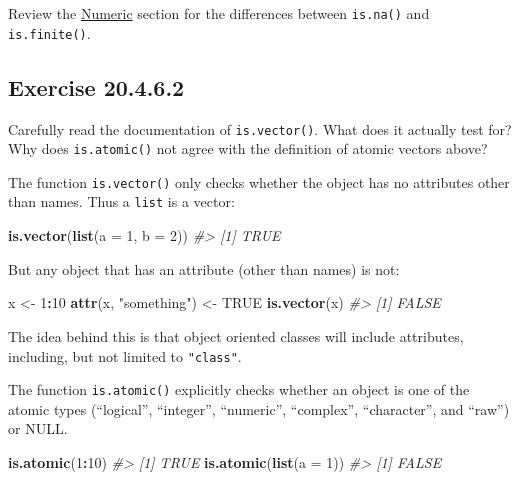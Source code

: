 \documentclass[]{book}
\newenvironment{Shaded}{\begin{snugshade}}{\end{snugshade}}
\newcommand{\CommentTok}[1]{\textcolor[rgb]{0.56,0.35,0.01}{\textit{#1}}}
\newcommand{\DataTypeTok}[1]{\textcolor[rgb]{0.13,0.29,0.53}{#1}}
\newcommand{\DecValTok}[1]{\textcolor[rgb]{0.00,0.00,0.81}{#1}}
\newcommand{\KeywordTok}[1]{\textcolor[rgb]{0.13,0.29,0.53}{\textbf{#1}}}
\newcommand{\NormalTok}[1]{#1}
\newcommand{\OperatorTok}[1]{\textcolor[rgb]{0.81,0.36,0.00}{\textbf{#1}}}
\newcommand{\OtherTok}[1]{\textcolor[rgb]{0.56,0.35,0.01}{#1}}
\newcommand{\StringTok}[1]{\textcolor[rgb]{0.31,0.60,0.02}{#1}}
\theoremstyle{plain}
\theoremstyle{remark}
\begin{document}
Review the \href{http://r4ds.had.co.nz/vectors.html\#numeric}{Numeric} section for the differences between \texttt{is.na()} and \texttt{is.finite()}.

\hypertarget{exercise-20.4.6.2}{%
\subsection*{\texorpdfstring{Exercise {20.4.6.2}}{Exercise 20.4.6.2}}\label{exercise-20.4.6.2}}

Carefully read the documentation of \texttt{is.vector()}. What does it actually test for? Why does \texttt{is.atomic()} not agree with the definition of atomic vectors above?

The function \texttt{is.vector()} only checks whether the object has no attributes other than names. Thus a \texttt{list} is a vector:

\begin{Shaded}
\begin{Highlighting}[]
\KeywordTok{is.vector}\NormalTok{(}\KeywordTok{list}\NormalTok{(}\DataTypeTok{a =} \DecValTok{1}\NormalTok{, }\DataTypeTok{b =} \DecValTok{2}\NormalTok{))}
\CommentTok{#> [1] TRUE}
\end{Highlighting}
\end{Shaded}

But any object that has an attribute (other than names) is not:

\begin{Shaded}
\begin{Highlighting}[]
\NormalTok{x <-}\StringTok{ }\DecValTok{1}\OperatorTok{:}\DecValTok{10}
\KeywordTok{attr}\NormalTok{(x, }\StringTok{"something"}\NormalTok{) <-}\StringTok{ }\OtherTok{TRUE}
\KeywordTok{is.vector}\NormalTok{(x)}
\CommentTok{#> [1] FALSE}
\end{Highlighting}
\end{Shaded}

The idea behind this is that object oriented classes will include attributes, including, but not limited to \texttt{"class"}.

The function \texttt{is.atomic()} explicitly checks whether an object is one of the atomic types (``logical'', ``integer'', ``numeric'', ``complex'', ``character'', and ``raw'') or NULL.

\begin{Shaded}
\begin{Highlighting}[]
\KeywordTok{is.atomic}\NormalTok{(}\DecValTok{1}\OperatorTok{:}\DecValTok{10}\NormalTok{)}
\CommentTok{#> [1] TRUE}
\KeywordTok{is.atomic}\NormalTok{(}\KeywordTok{list}\NormalTok{(}\DataTypeTok{a =} \DecValTok{1}\NormalTok{))}
\CommentTok{#> [1] FALSE}
\end{Highlighting}
\end{Shaded}
\end{document}
